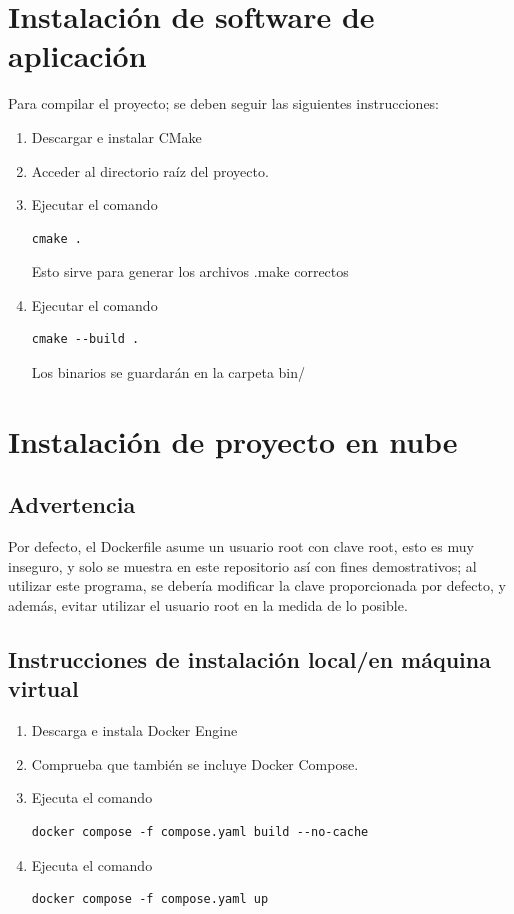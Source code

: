 \documentclass[12pt,a4paper,twoside,openright]{book}
\begin{document}
\begin{umaappendices}
\section{Instalación de software de aplicación}

Para compilar el proyecto; se deben seguir las siguientes instrucciones:

\begin{enumerate}
  \item Descargar e instalar CMake
  \item Acceder al directorio raíz del proyecto.
  \item Ejecutar el comando \begin{verbatim}cmake .\end{verbatim} Esto sirve para generar los archivos .make correctos 
  \item Ejecutar el comando \begin{verbatim}cmake --build .\end{verbatim} Los binarios se guardarán en la carpeta bin/
\end{enumerate}


\section{Instalación de proyecto en nube}

\subsection{Advertencia}

Por defecto, el Dockerfile asume un usuario root con clave root, esto es muy inseguro, y solo se muestra en este repositorio así con fines demostrativos; al utilizar este programa, se debería modificar la clave proporcionada por defecto, y además, evitar utilizar el usuario root en la medida de lo posible.

\subsection{Instrucciones de instalación local/en máquina virtual}

\begin{enumerate}
  \item Descarga e instala Docker Engine
  \item Comprueba que también se incluye Docker Compose.
  \item Ejecuta el comando \begin{verbatim}docker compose -f compose.yaml build --no-cache\end{verbatim}
  \item Ejecuta el comando \begin{verbatim}docker compose -f compose.yaml up\end{verbatim}
\end{enumerate}



\end{umaappendices}
\end{document}
